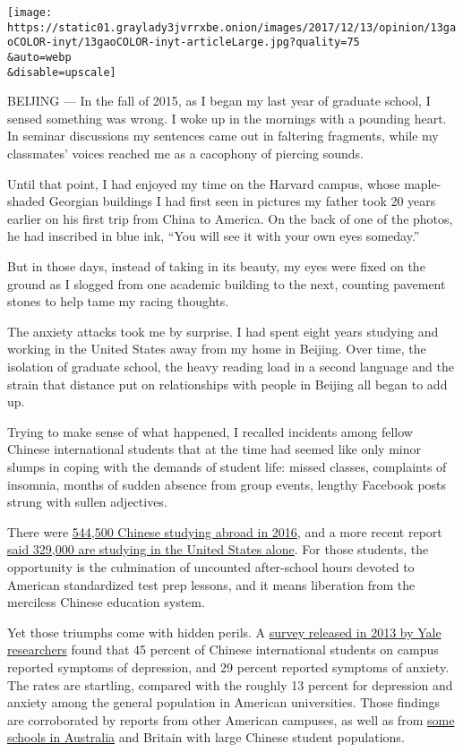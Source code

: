 \texttt{[image: https://static01.graylady3jvrrxbe.onion/images/2017/12/13/opinion/13gaoCOLOR-inyt/13gaoCOLOR-inyt-articleLarge.jpg?quality=75\\\&auto=webp\\\&disable=upscale]}

BEIJING --- In the fall of 2015, as I began my last year of graduate
school, I sensed something was wrong. I woke up in the mornings with a
pounding heart. In seminar discussions my sentences came out in
faltering fragments, while my classmates' voices reached me as a
cacophony of piercing sounds.

Until that point, I had enjoyed my time on the Harvard campus, whose
maple-shaded Georgian buildings I had first seen in pictures my father
took 20 years earlier on his first trip from China to America. On the
back of one of the photos, he had inscribed in blue ink, ``You will see
it with your own eyes someday.''

But in those days, instead of taking in its beauty, my eyes were fixed
on the ground as I slogged from one academic building to the next,
counting pavement stones to help tame my racing thoughts.

The anxiety attacks took me by surprise. I had spent eight years
studying and working in the United States away from my home in Beijing.
Over time, the isolation of graduate school, the heavy reading load in a
second language and the strain that distance put on relationships with
people in Beijing all began to add up.

Trying to make sense of what happened, I recalled incidents among fellow
Chinese international students that at the time had seemed like only
minor slumps in coping with the demands of student life: missed classes,
complaints of insomnia, months of sudden absence from group events,
lengthy Facebook posts strung with sullen adjectives.

There were
\href{http://www.chinadaily.com.cn/china/2017twosession/2017-03/08/content_28470916.htm}{544,500
Chinese studying abroad in 2016}, and a more recent report
\href{https://www.nytimes3xbfgragh.onion/2017/05/04/us/chinese-students-western-campuses-china-influence.html?_r=0}{said
329,000 are studying in the United States alone}. For those students,
the opportunity is the culmination of uncounted after-school hours
devoted to American standardized test prep lessons, and it means
liberation from the merciless Chinese education system.

Yet those triumphs come with hidden perils. A
\href{https://www.researchgate.net/publication/234103690_Report_of_a_Mental_Health_Survey_Among_Chinese_International_Students_at_Yale_University}{survey
released in 2013 by Yale researchers} found that 45 percent of Chinese
international students on campus reported symptoms of depression, and 29
percent reported symptoms of anxiety. The rates are startling, compared
with the roughly 13 percent for depression and anxiety among the general
population in American universities. Those findings are corroborated by
reports from other American campuses, as well as from
\href{https://www.timeshighereducation.com/news/chinese-students-still-more-stressed-when-abroad}{some
schools in Australia} and Britain with large Chinese student
populations.

